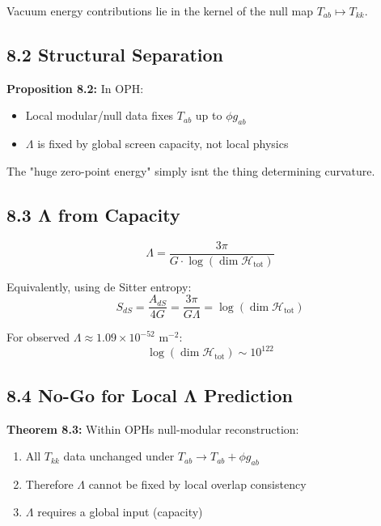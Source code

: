Vacuum energy contributions lie in the kernel of the null map \(T_{ab} \mapsto T_{kk}\).

\subsection{8.2 Structural Separation}\label{82-structural-separation}

\textbf{Proposition 8.2:} In OPH:

\begin{itemize}
\tightlist
\item
  Local modular/null data fixes \(T_{ab}\) up to \(\phi g_{ab}\)
\item
  \(\Lambda\) is fixed by global screen capacity, not local physics
\end{itemize}

The "huge zero-point energy" simply isn\textquotesingle t the thing determining curvature.

\subsection{8.3 Λ from Capacity}\label{83-ux3bb-from-capacity}

\[\Lambda = \frac{3\pi}{G \cdot \log(\dim \mathcal{H}_{\text{tot}})}\]

Equivalently, using de Sitter entropy: \[S_{dS} = \frac{A_{dS}}{4G} = \frac{3\pi}{G\Lambda} = \log(\dim \mathcal{H}_{\text{tot}})\]

For observed \(\Lambda \approx 1.09 \times 10^{-52}\) m\(^{-2}\): \[\log(\dim \mathcal{H}_{\text{tot}}) \sim 10^{122}\]

\subsection{8.4 No-Go for Local Λ Prediction}\label{84-no-go-for-local-ux3bb-prediction}

\textbf{Theorem 8.3:} Within OPH\textquotesingle s null-modular reconstruction:

\begin{enumerate}
\def\labelenumi{\arabic{enumi}.}
\tightlist
\item
  All \(T_{kk}\) data unchanged under \(T_{ab} \to T_{ab} + \phi g_{ab}\)
\item
  Therefore \(\Lambda\) cannot be fixed by local overlap consistency
\item
  \(\Lambda\) requires a global input (capacity)
\end{enumerate}

